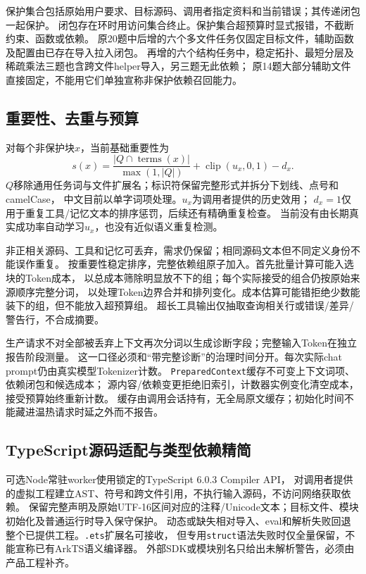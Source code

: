 \documentclass[UTF8,a4paper,11pt,fontset=fandol]{ctexart}
\begin{document}
保护集合包括原始用户要求、目标源码、调用者指定资料和当前错误；其传递闭包一起保护。
闭包存在环时用访问集合终止。保护集合超预算时显式报错，不截断约束、函数或依赖。
原20题中后增的六个多文件任务仅固定目标文件，辅助函数及配置由已存在导入拉入闭包。
再增的六个结构任务中，稳定拓扑、最短分层及稀疏乘法三题也含跨文件helper导入，另三题无此依赖；
原14题大部分辅助文件直接固定，不能用它们单独宣称非保护依赖召回能力。

\subsection{重要性、去重与预算}
对每个非保护块$x$，当前基础重要性为
\[
 s(x)=\frac{|Q\cap\operatorname{terms}(x)|}{\max(1,|Q|)}
       +\operatorname{clip}(u_x,0,1)-d_x.
\]
$Q$移除通用任务词与文件扩展名；标识符保留完整形式并拆分下划线、点号和camelCase，
中文目前以单字词项处理。$u_x$为调用者提供的历史效用；
$d_x=1$仅用于重复工具/记忆文本的排序惩罚，后续还有精确重复检查。
当前没有由长期真实成功率自动学习$u_x$，也没有近似语义重复检测。

非正相关源码、工具和记忆可丢弃，需求仍保留；相同源码文本但不同定义身份不能误作重复。
按重要性稳定排序，完整依赖组原子加入。首先批量计算可能入选块的Token成本，
以总成本筛除明显放不下的组；每个实际接受的组合仍按原始来源顺序完整分词，
以处理Token边界合并和排列变化。成本估算可能错拒绝少数能装下的组，但不能放入超预算组。
超长工具输出仅抽取查询相关行或错误/差异/警告行，不合成摘要。

生产请求不对全部被丢弃上下文再次分词以生成诊断字段；完整输入Token在独立报告阶段测量。
这一口径必须和“带完整诊断”的治理时间分开。每次实际chat prompt仍由真实模型Tokenizer计数。
\texttt{PreparedContext}缓存不可变上下文词项、依赖闭包和候选成本；
源内容/依赖变更拒绝旧索引，计数器实例变化清空成本，接受预算始终重新计数。
缓存由调用会话持有，无全局原文缓存；初始化时间不能藏进温热请求时延之外而不报告。

\subsection{TypeScript源码适配与类型依赖精简}
可选Node常驻worker使用锁定的TypeScript 6.0.3 Compiler API\cite{tsapi}，
对调用者提供的虚拟工程建立AST、符号和跨文件引用，不执行输入源码，不访问网络获取依赖。
保留完整声明及原始UTF-16区间对应的注释/Unicode文本；目标文件、模块初始化及普通运行时导入保守保护。
动态或缺失相对导入、eval和解析失败回退整个已提供工程。\texttt{.ets}扩展名可接收，
但专用\texttt{struct}语法失败时仅全量保留，不能宣称已有ArkTS语义编译器。
外部SDK或模块别名只给出未解析警告，必须由产品工程补齐。
\end{document}
